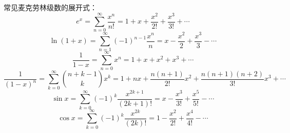 常见麦克劳林级数的展开式：
\[
e^x = \sum_{n=0}^{\infty} \frac{x^n}{n!} = 1 + x + \frac{x^2}{2!} + \frac{x^3}{3!} + \cdots
\]
\[
\ln(1+x) = \sum_{n=1}^{\infty} (-1)^{n-1} \frac{x^n}{n} = x - \frac{x^2}{2} + \frac{x^3}{3} - \cdots
\]
\[
\frac{1}{1-x} = \sum_{n=0}^{\infty} x^n = 1 + x + x^2 + x^3 + \cdots
\]
\[
\frac{1}{(1-x)^n} = \sum_{k=0}^{\infty} \binom{n+k-1}{k} x^k = 1 + nx + \frac{n(n+1)}{2!}x^2 + \frac{n(n+1)(n+2)}{3!}x^3 + \cdots
\]
\[
\sin x = \sum_{k=0}^{\infty} (-1)^k \frac{x^{2k+1}}{(2k+1)!} = x - \frac{x^3}{3!} + \frac{x^5}{5!} - \cdots
\]
\[
\cos x = \sum_{k=0}^{\infty} (-1)^k \frac{x^{2k}}{(2k)!} = 1 - \frac{x^2}{2!} + \frac{x^4}{4!} - \cdots
\]